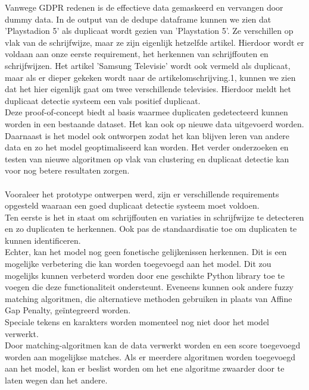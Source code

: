 Vanwege GDPR redenen is de effectieve data gemaskeerd  en vervangen door dummy data. In de output van de dedupe dataframe kunnen we zien dat 'Playstadion 5' als duplicaat wordt gezien van 'Playstation 5'. Ze verschillen op vlak van de schrijfwijze, maar ze zijn eigenlijk hetzelfde artikel. Hierdoor wordt er voldaan aan onze eerste requirement, het herkennen van schrijffouten en schrijfwijzen. Het artikel 'Samsung Televisie' wordt ook vermeld als duplicaat, maar als er dieper gekeken wordt naar de artikelomschrijving.1, kunnen we zien dat het hier eigenlijk gaat om twee verschillende televisies. Hierdoor meldt het duplicaat detectie systeem een vals positief duplicaat. 
\\Deze proof-of-concept biedt al basis waarmee duplicaten gedetecteerd kunnen worden in een bestaande dataset. Het kan ook op nieuwe data uitgevoerd worden. Daarnaast is het model ook ontworpen zodat het kan blijven leren van andere data en zo het model geoptimaliseerd kan worden. Het verder onderzoeken en testen van nieuwe algoritmen op vlak van clustering en duplicaat detectie kan voor nog betere resultaten zorgen. 
\\ \\Vooraleer het prototype ontwerpen werd, zijn er verschillende requirements opgesteld waaraan een goed duplicaat detectie systeem moet voldoen.
\\Ten eerste is het in staat om schrijffouten en variaties in schrijfwijze te detecteren en zo duplicaten te herkennen. Ook pas de standaardisatie toe om duplicaten te kunnen identificeren.
\\Echter, kan het model nog geen fonetische gelijkenissen herkennen. Dit is een mogelijke verbetering die kan worden toegevoegd aan het model. Dit zou mogelijks kunnen verbeterd worden door ene geschikte Python library toe te voegen die deze functionaliteit ondersteunt. Eveneens kunnen ook andere fuzzy matching algoritmen, die alternatieve methoden gebruiken in plaats van Affine Gap Penalty, geïntegreerd worden.
\\Speciale tekens en karakters worden momenteel nog niet door het model verwerkt.
\\Door matching-algoritmen kan de data verwerkt worden en een score toegevoegd worden aan mogelijkse matches. Als er meerdere algoritmen worden toegevoegd aan het model, kan er beslist worden om het ene algoritme zwaarder door te laten wegen dan het andere. 
